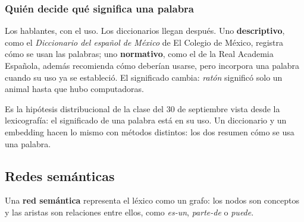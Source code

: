 \documentclass[11pt,letterpaper]{article}
\begin{document}
\subsubsection*{Quién decide qué significa una palabra}

Los hablantes, con el uso. Los diccionarios llegan después. Uno
\textbf{descriptivo}, como el \textit{Diccionario del español de
México} de El Colegio de México, registra cómo se usan las palabras;
uno \textbf{normativo}, como el de la Real Academia Española, además
recomienda cómo deberían usarse, pero incorpora una palabra cuando su
uso ya se estableció. El significado cambia: \textit{ratón} significó
solo un animal hasta que hubo computadoras.

\begin{idea}
    Es la hipótesis distribucional de la clase del $30$ de septiembre
    vista desde la lexicografía: el significado de una palabra está en
    su uso. Un diccionario y un embedding hacen lo mismo con métodos
    distintos: los dos resumen cómo se usa una palabra.
\end{idea}


\subsection*{Redes semánticas}

Una \textbf{red semántica} representa el léxico como un grafo: los
nodos son conceptos y las aristas son relaciones entre ellos, como
\textit{es-un}, \textit{parte-de} o \textit{puede}.

\begin{center}
\end{center}
\end{document}
